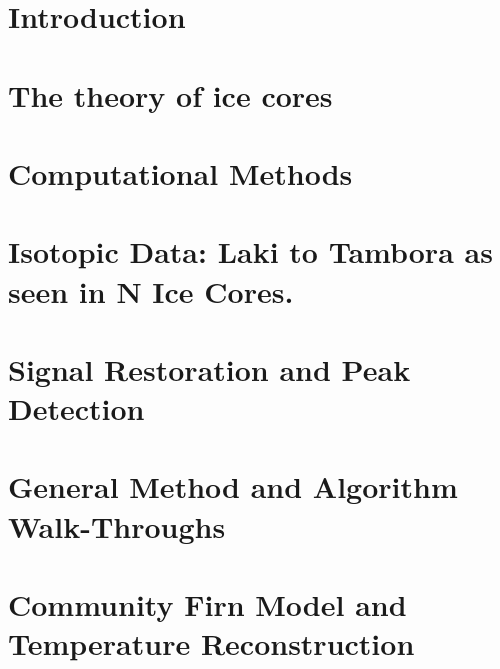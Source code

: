 \documentclass[11pt]{memoir}
\begin{document}
\newpage
 

\tableofcontents*{}


\newpage
\listoffigures

\listoftables

\lstlistoflistings


\mainmatter

\chapter[Introduction][Introduction]{Introduction}




\chapter[Ice Theory][Ice Theory]{The theory of ice cores}



\chapter[Computational Methods]{Computational Methods}

%

\chapter[Data][Data]{Isotopic Data: Laki to Tambora as seen in N Ice Cores.}




\chapter[Signal Analysis][Signal Analysis]{Signal Restoration and Peak Detection}




\chapter[Method][Method]{General Method and Algorithm Walk-Throughs}




\chapter[Temperature Reconstruction]{Community Firn Model and Temperature Reconstruction}
\end{document}
